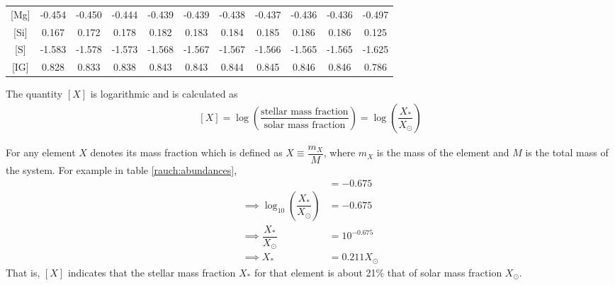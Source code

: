 \begin{table}[h!]
\begin{tabular}{ccccccccccc}
						{[}Mg{]} & \multicolumn{1}{c}{-0.454} & \multicolumn{1}{c}{-0.450} & \multicolumn{1}{c}{-0.444} & \multicolumn{1}{c}{-0.439} & \multicolumn{1}{c}{-0.439} & \multicolumn{1}{c}{-0.438} & \multicolumn{1}{c}{-0.437} & \multicolumn{1}{c}{-0.436} & \multicolumn{1}{c}{-0.436} & -0.497 \\ %
						{[}Si{]} & \multicolumn{1}{c}{0.167} & \multicolumn{1}{c}{0.172} & \multicolumn{1}{c}{0.178} & \multicolumn{1}{c}{0.182} & \multicolumn{1}{c}{0.183} & \multicolumn{1}{c}{0.184} & \multicolumn{1}{c}{0.185} & \multicolumn{1}{c}{0.186} & \multicolumn{1}{c}{0.186} & 0.125 \\ %
						{[}S{]} & \multicolumn{1}{c}{-1.583} & \multicolumn{1}{c}{-1.578} & \multicolumn{1}{c}{-1.573} & \multicolumn{1}{c}{-1.568} & \multicolumn{1}{c}{-1.567} & \multicolumn{1}{c}{-1.567} & \multicolumn{1}{c}{-1.566} & \multicolumn{1}{c}{-1.565} & \multicolumn{1}{c}{-1.565} & -1.625 \\ %
						{[}IG{]} & \multicolumn{1}{c}{0.828} & \multicolumn{1}{c}{0.833} & \multicolumn{1}{c}{0.838} & \multicolumn{1}{c}{0.843} & \multicolumn{1}{c}{0.843} & \multicolumn{1}{c}{0.844} & \multicolumn{1}{c}{0.845} & \multicolumn{1}{c}{0.846} & \multicolumn{1}{c}{0.846} & 0.786 \\ \hline
					\end{tabular}
				\end{table}
				
				The quantity $[X]$ is logarithmic and is calculated as
				\begin{align}
					\label{rauch:[X]}
					[X]=\log{\left(\dfrac{\text{stellar mass fraction}}{\text{solar mass fraction}}\right)}=\log{\left(\dfrac{X_*}{X_\odot}\right)}
				\end{align}
				
				For any element $X$ denotes its mass fraction which is defined as $X\equiv\dfrac{m_X}{M}$, where $m_X$ is the mass of the element and $M$ is the total mass of the system. For example in table \ref{rauch:abundances},
				\begin{align*}
					[X]&=-0.675 \\
					\implies \log_{10}\left(\dfrac{X_*}{X_\odot}\right)&=-0.675 \\
					\implies \dfrac{X_*}{X_\odot}&=10^{-0.675} \\
					\implies X_*&=0.211X_\odot
				\end{align*}
				That is, $[X]$ indicates that the stellar mass fraction $X_*$ for that element is about 21\% that of solar mass fraction $X_\odot$.
				
